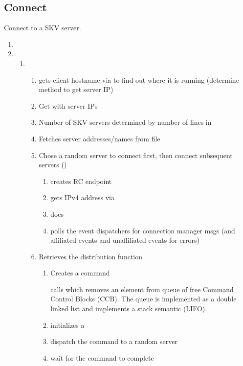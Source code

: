 \subsection{Connect}
Connect to a SKV server.
\begin{enumerate} \parskip-0.5ex
\item {}
\item {}
  \begin{enumerate} \parskip-0.5ex
  \item {}
    \begin{enumerate} \parskip-0.5ex
    \item gets client hostname via  to find out
      where it is running (determine method to get server IP)
    \item Get  with server IPs
    \item Number of SKV servers determined by number of lines in\\ 
    \item Fetches server addresses/names from file
    \item Chose a random server to connect first, then connect
      subsequent servers ()
      \begin{enumerate}
      \item creates RC endpoint
      \item gets IPv4 address via 
      \item does 
      \item polls the event dispatchers for connection manager msgs
        (and affiliated events and unaffiliated events for errors)
      \end{enumerate}
    \item Retrieves the distribution function
      \begin{enumerate}
      \item Creates a command

        calls 
        which removes an element from queue of free Command Control
        Blocks (CCB). The queue is implemented as a double linked
        list and implements a stack semantic (LIFO).
      \item initializes a 
      \item dispatch the command to a random server
      \item wait for the command to complete
      \end{enumerate}
    \end{enumerate}
  \end{enumerate}
\end{enumerate}


